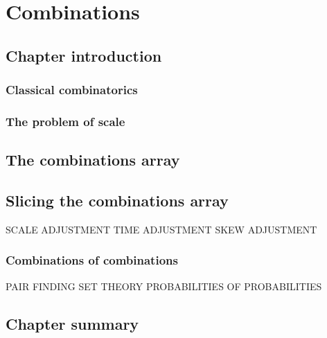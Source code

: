 \chapter{Combinations}
\minitoc
\section{Chapter introduction}
\subsection{Classical combinatorics}
\subsection{The problem of scale}
\section{The combinations array}
\section{Slicing the combinations array}
SCALE ADJUSTMENT
TIME ADJUSTMENT
SKEW ADJUSTMENT
\subsection{Combinations of combinations}
PAIR FINDING
SET THEORY
PROBABILITIES OF PROBABILITIES
\section{Chapter summary}
